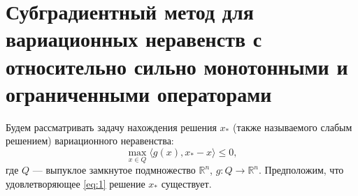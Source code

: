 \section{Субградиентный метод для вариационных неравенств с относительно сильно монотонными и ограниченными операторами}\label{sec:ch2/sec2}

    Будем рассматривать задачу нахождения решения $x_*$ (также называемого слабым решением) вариационного неравенства: 
    \begin{equation}\label{eq:1}
        \max_{x \in Q} \langle g(x), x_* - x \rangle \leq 0,
    \end{equation}
    где $Q$ --- выпуклое замкнутое подмножество $\mathbb{R}^n$,
    $g: Q \longrightarrow \mathbb{R}^n$. Предположим, что удовлетворяющее \eqref{eq:1} решение $x_*$ существует.

